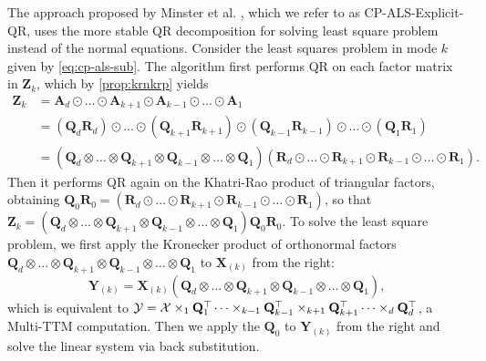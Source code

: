 \documentclass{article}
\newcommand{\mat}[1]{\mathbf{#1}}
\newcommand{\T}[2][]{#1{\mathbf{\cal{#2}}}} 						%
\begin{document}
The approach proposed by Minster et al. \cite{MVLB23}, which we refer to as CP-ALS-Explicit-QR, uses the more stable QR decomposition for solving least square problem instead of the normal equations.
Consider the least squares problem in mode $k$ given by \cref{eq:cp-als-sub}.
The algorithm first performs QR on each factor matrix in $\mat{Z}_k$, which by \cref{prop:krnkrp} yields
\begin{align*}
  \mat{Z}_k &= \mat{A}_d \odot \dots \odot \mat{A}_{k+1} \odot \mat{A}_{k-1} \odot \dots \odot \mat{A}_1 \\
  &= (\mat{Q}_d\mat{R}_d) \odot \dots \odot (\mat{Q}_{k+1}\mat{R}_{k+1}) \odot (\mat{Q}_{k-1}\mat{R}_{k-1}) \odot \dots \odot (\mat{Q}_1\mat{R}_1)  \\
  &= (\mat{Q}_d \otimes \dots \otimes \mat{Q}_{k+1} \otimes \mat{Q}_{k-1} \otimes \dots \otimes \mat{Q}_1)(\mat{R}_d \odot \dots \odot \mat{R}_{k+1} \odot \mat{R}_{k-1} \odot \dots \odot \mat{R}_1).  
\end{align*}
Then it performs QR again on the Khatri-Rao product of triangular factors, obtaining $\mat{Q}_0\mat{R}_0= (\mat{R}_d \odot \dots \odot \mat{R}_{k+1} \odot \mat{R}_{k-1} \odot \dots \odot \mat{R}_1)$, so that $\mat{Z}_k = (\mat{Q}_d \otimes \dots \otimes \mat{Q}_{k+1} \otimes \mat{Q}_{k-1} \otimes \dots \otimes \mat{Q}_1)\mat{Q}_0\mat{R}_0$.
To solve the least square problem, we first apply the Kronecker product of orthonormal factors $\mat{Q}_d \otimes \dots \otimes \mat{Q}_{k+1} \otimes \mat{Q}_{k-1} \otimes \dots \otimes \mat{Q}_1$ to $\mat{X}_{(k)}$ from the right:
$$\mat{Y}_{(k)} = \mat{X}_{(k)}(\mat{Q}_d \otimes \dots \otimes \mat{Q}_{k+1} \otimes \mat{Q}_{k-1} \otimes \dots \otimes \mat{Q}_1),$$
which is equivalent to $\T{Y}=\T{X} \times_1 \mat{Q}_1^{\top} \cdots \times_{k-1} \mat{Q}_{k-1}^{\top}\times_{k+1} \mat{Q}_{k+1}^{\top} \cdots \times_{d} \mat{Q}_{d}^{\top}$, a Multi-TTM computation.
Then we apply the $\mat{Q}_0$ to $\mat{Y}_{(k)}$ from the right and solve the linear system via back substitution.

\begin{algorithm}
  \caption{CP-ALS-QR-Exp}
  \label{alg:cp-als-qr}
  
\end{algorithm}
\end{document}
